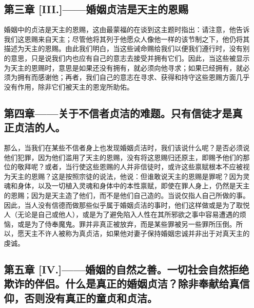 
\subsection{第三章 [III.]——婚姻贞洁是天主的恩赐}

婚姻中的贞洁是天主的恩赐，这由最蒙福的在谈到这主题时指出：请注意，他告诉我们这恩赐来自天主；尽管他将其列于他愿众人像他一样的该节制之下，他仍将其描述为天主的恩赐。由此我们明白，当这些诫命赐给我们以便我们遵行时，没有别的意思，只是说我们内也应有自己的意志去接受并拥有它们。因此，当这些被显示为天主的恩赐时，意思是如果还没有拥有，就必须向他寻求；如果已经拥有，就必须为拥有而感谢他；再者，我们自己的意志在寻求、获得和持守这些恩赐方面几乎没有作用，除非它们被天主的恩宠所助佑。\par


\subsection{第四章——关于不信者贞洁的难题。只有信徒才是真正贞洁的人。}

那么，当我们在某些不信者身上也发现婚姻贞洁时，我们该说什么呢？是否必须说他们犯罪，因为他们滥用了天主的恩赐，没有将这恩赐归还原主，即赐予他们的那位的敬拜呢？或者，当行使这些恩赐的人并非信徒时，或许这些禀赋根本不应被视为天主的恩赐？这是按照宗徒的说法，他说：但谁敢说天主的恩赐是罪呢？因为灵魂和身体，以及一切植入灵魂和身体中的本性禀赋，即使在罪人身上，仍然是天主的恩赐；因为是天主造了他们，而不是他们自己造的。当说仅指人自己所做的事。因此，当人没有信德而做那些似乎属于婚姻贞洁的事时，他们这样做或是为了取悦人（无论是自己或他人），或是为了避免陷入人性在其所邪欲之事中容易遭遇的烦恼，或是为了侍奉魔鬼。罪并非真正被放弃，而是某些罪被另一些罪所压倒。所以，愿天主不许人被称为真贞洁，如果他对妻子保持婚姻忠诚并非出于对真天主的虔诚。\par


\subsection{第五章 [IV.]——婚姻的自然之善。一切社会自然拒绝欺诈的伴侣。什么是真正的婚姻贞洁？除非奉献给真信仰，否则没有真正的童贞和贞洁。}

